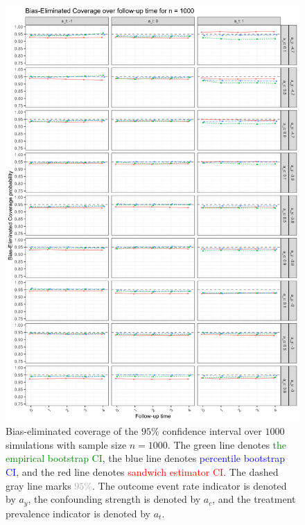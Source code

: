 \documentclass[pdflatex,sn-vancouver-ay]{sn-jnl}%
\theoremstyle{thmstyleone}%
\theoremstyle{thmstyletwo}%
\theoremstyle{thmstylethree}%
\begin{document}
\begin{appendices}
\begin{figure}[H]
\centering
\includegraphics[height=0.95\textheight]{plots/plots_bias_coverage1000.png}
\caption{Bias-eliminated coverage of the $95\%$ confidence interval over $1000$ simulations with sample size $n = 1000$. The green line denotes \textcolor{green}{the empirical bootstrap CI}, the blue line denotes \textcolor{blue}{percentile bootstrap CI}, and the red line denotes \textcolor{red}{sandwich estimator CI}. The dashed gray line marks \textcolor{darkgray}{$95\%$}. The outcome event rate indicator is denoted by $a_y$, the confounding strength is denoted by $a_c$, and the treatment prevalence indicator is denoted by $a_t$.}\label{plt:biascoverage1000}
\end{figure}

\newpage


\end{appendices}
\end{document}
